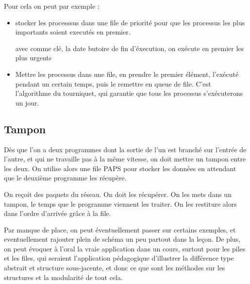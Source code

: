Pour cela on peut par exemple : \begin{itemize}
	\item stocker les processsus dans une file de priorité pour que les processus les plus importants soient executés en premier.
\begin{example} avec comme clé, la date butoire de fin d'éxecution, on exécute en premier les plus urgents
\end{example}
	\item Mettre les processus dans une file, en prendre le premier élément, l'exécuté pendant un certain temps, puis le remettre en queue de file. C'est l'algorithme du tourniquet, qui garantie que tous les processus s'exécuterons un jour.
\end{itemize}

\subsection{Tampon}
	
	Dès que l'on a deux programmes dont la sortie de l'un est branché sur l'entrée de l'autre, et qui ne travaille pas à la même vitesse, on doit mettre un tampon entre les deux. On utilise alors une file PAPS pour stocker les données en attendant que le deuxième programme les récupère.
	
	\begin{example}
		On reçoit des paquets du réseau. On doit les récupérer. On les mets dans un tampon, le temps que le programme viennent les traiter. On les restiture alors dans l'ordre d'arrivée grâce à la file.
	\end{example}

\begin{com}
	Par manque de place, on peut éventuellement passer sur certains exemples, et eventuellement rajouter plein de schéma un peu partout dans la leçon. De plus, on peut évoquer à l'oral la vraie application dans un cours, surtout pour les piles et les files, qui seraient l'application pédagogique d'illustrer la différence type abstrait et structure sous-jacente, et donc ce que sont les méthodes sur les structures et la modularité de tout cela.
\end{com}